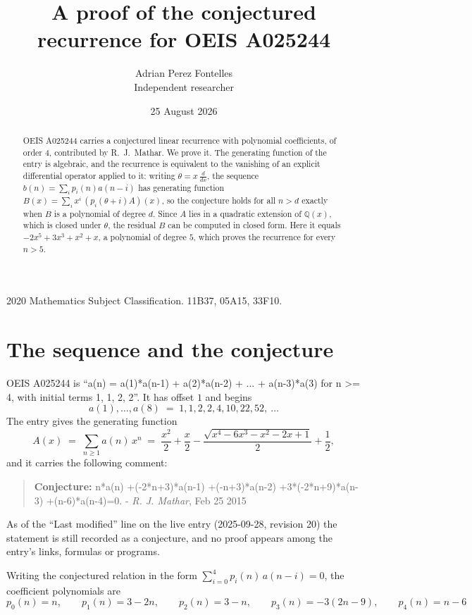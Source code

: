 \documentclass[11pt,a4paper]{article}
\title{A proof of the conjectured recurrence for OEIS A025244}
\author{Adrian Perez Fontelles\\ \small Independent researcher}
\date{25 August 2026}
\theoremstyle{plain}
\theoremstyle{definition}
\begin{document}
\maketitle

\begin{abstract}
OEIS A025244 carries a conjectured linear recurrence with polynomial coefficients, of
order 4, contributed by R.~J.~Mathar. We prove it. The generating function of the
entry is algebraic, and the recurrence is equivalent to the vanishing of an explicit
differential operator applied to it: writing $\theta=x\,\frac{d}{dx}$, the sequence
$b(n)=\sum_{i}p_{i}(n)a(n-i)$ has generating function
$B(x)=\sum_{i}x^{i}\,(p_{i}(\theta+i)A)(x)$, so the conjecture holds for all $n>d$ exactly
when $B$ is a polynomial of degree $d$. Since $A$ lies in a quadratic extension of
$\mathbb{Q}(x)$, which is closed under $\theta$, the residual $B$ can be computed in
closed form. Here it equals $- 2 x^{5} + 3 x^{3} + x^{2} + x$, a polynomial of degree $5$, which proves
the recurrence for every $n>5$.
\end{abstract}

\noindent\small 2020 Mathematics Subject Classification. 11B37, 05A15, 33F10.\normalsize

\section{The sequence and the conjecture}

OEIS A025244 is ``a(n) = a(1)*a(n-1) + a(2)*a(n-2) + ... + a(n-3)*a(3) for n >= 4, with initial terms 1, 1, 2, 2''. It has offset $1$ and begins
\[
a(1),\dots,a(8)\;=\;1, 1, 2, 2, 4, 10, 22, 52,\ \dots
\]
The entry gives the generating function
\begin{equation}\label{eq:gf}
A(x)\;=\;\sum_{n\ge 1} a(n)\,x^{n}\;=\;\frac{x^{2}}{2} + \frac{x}{2} - \frac{\sqrt{x^{4} - 6 x^{3} - x^{2} - 2 x + 1}}{2} + \frac{1}{2} ,
\end{equation}
and it carries the following comment:
\begin{quote}\small
\textbf{Conjecture:} n*a(n) +(-2*n+3)*a(n-1) +(-n+3)*a(n-2) +3*(-2*n+9)*a(n-3) +(n-6)*a(n-4)=0. - \emph{R. J. Mathar}, Feb 25 2015
\end{quote}
As of the ``Last modified'' line on the live entry (2025-09-28, revision 20) the
statement is still recorded as a conjecture, and no proof appears among the entry's links,
formulas or programs.

Writing the conjectured relation in the form $\sum_{i=0}^{4}p_{i}(n)\,a(n-i)=0$,
the coefficient polynomials are
\[
p_{0}(n)=n,\qquad p_{1}(n)=3 - 2 n,\qquad p_{2}(n)=3 - n,\qquad p_{3}(n)=- 3 \left(2 n - 9\right),\qquad p_{4}(n)=n - 6
\]
\end{document}
